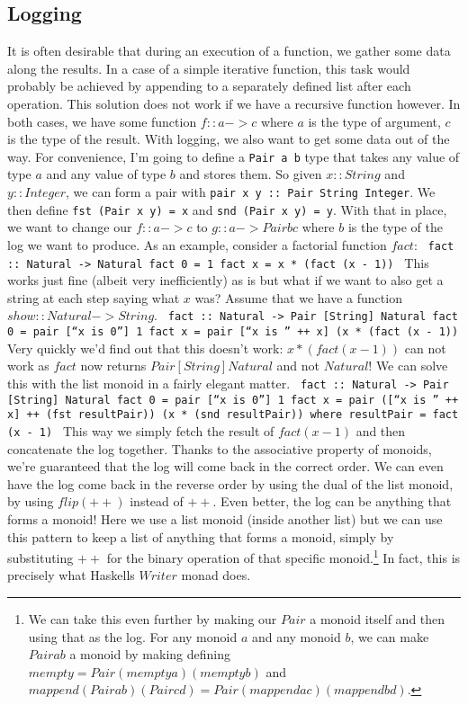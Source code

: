 \documentclass{acm_proc_article-sp}
\begin{document}
{\begin{itemize}
\subsection{Logging}
It is often desirable that during an execution of a function, we
gather some data along the results. In a case of a simple iterative
function, this task would probably be achieved by appending to a
separately defined list after each operation. This solution does not
work if we have a recursive function however.
In both cases, we have some function $f :: a -> c$ where $a$ is
the type of argument, $c$ is the type of the result. With logging, we
also want to get some data out of the way. For convenience, I'm going
to define a \texttt{Pair a b} type that takes any value of type $a$ and any
value of type $b$ and stores them. So given $x :: String$ and $y ::
Integer$, we can form a pair with \texttt{pair x y :: Pair String
Integer}. We then define \texttt{fst (Pair x y) = x} and \texttt{snd (Pair x y) =
y}. With that in place, we want to change our $f :: a -> c$ to $g :: a
-> Pair b c$ where $b$ is the type of the log we want to
produce. As an example, consider a factorial function $fact$:
\texttt{
fact :: Natural -> Natural
fact 0 = 1
fact x = x * (fact (x - 1))
}
This works just fine (albeit very inefficiently) as is but what if we
want to also get a string at each step saying what $x$ was? Assume
that we have a function $show :: Natural -> String$.
\texttt{
fact :: Natural -> Pair [String] Natural
fact 0 = pair [``x is 0''] 1
fact x = pair [``x is '' ++ x] (x * (fact (x - 1))
}
Very quickly we'd find out that this doesn't work: $x * (fact (x -
1))$ can not work as $fact$ now returns $Pair [String] Natural$ and
not $Natural$! We can solve this with the list monoid in a fairly
elegant matter.
\texttt{
fact :: Natural -> Pair [String] Natural
fact 0 = pair [``x is 0''] 1
fact x = pair ([``x is '' ++ x] ++ (fst resultPair)) (x * (snd
resultPair))
  where resultPair = fact (x - 1)
}
This way we simply fetch the result of $fact (x - 1)$ and then
concatenate the log together. Thanks to the associative property of
monoids, we're guaranteed that the log will come back in the correct
order. We can even have the log come back in the reverse order by
using the dual of the list monoid, by using $flip (++)$ instead of
$++$. Even better, the log can be anything that forms a monoid! Here
we use a list monoid (inside another list) but we can use this pattern
to keep a list of anything that forms a monoid, simply by
substituting $++$ for the binary operation of that specific
monoid.\footnote{We can take this even further by making our $Pair$ a
  monoid itself and then using that as the log. For any monoid $a$ and
any monoid $b$, we can make $Pair a b$ a monoid by making defining
$mempty = Pair (mempty a) (mempty b)$ and $mappend (Pair a b) (Pair c
d) = Pair (mappend a c) (mappend b d)$.} In
fact, this is precisely what Haskells $Writer$ monad does.


\end{itemize}}
\end{document}
